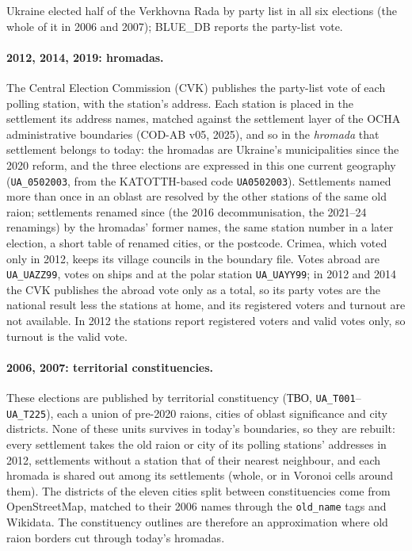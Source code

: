 Ukraine elected half of the Verkhovna Rada by party list in all six elections
(the whole of it in 2006 and 2007); BLUE\_DB reports the party-list vote.

\paragraph{2012, 2014, 2019: hromadas.}  The Central Election Commission (CVK)
publishes the party-list vote of each polling station, with the station's
address.  Each station is placed in the settlement its address names, matched
against the settlement layer of the OCHA administrative boundaries (COD-AB
v05, 2025), and so in the \textit{hromada} that settlement belongs to today:
the hromadas are Ukraine's municipalities since the 2020 reform, and the three
elections are expressed in this one current geography (\texttt{UA\_0502003},
from the KATOTTH-based code \texttt{UA0502003}).  Settlements named more than
once in an oblast are resolved by the other stations of the same old raion;
settlements renamed since (the 2016 decommunisation, the 2021--24 renamings)
by the hromadas' former names, the same station number in a later election, a
short table of renamed cities, or the postcode.  Crimea, which voted only in
2012, keeps its village councils in the boundary file.  Votes abroad are
\texttt{UA\_UAZZ99}, votes on ships and at the polar station \texttt{UA\_UAYY99};
in 2012 and 2014 the CVK publishes the abroad vote only as a total, so its
party votes are the national result less the stations at home, and its
registered voters and turnout are not available.  In 2012 the stations report
registered voters and valid votes only, so turnout is the valid vote.

\paragraph{2006, 2007: territorial constituencies.}  These elections are
published by territorial constituency (ТВО, \texttt{UA\_T001}--\texttt{UA\_T225}),
each a union of pre-2020 raions, cities of oblast significance and city
districts.  None of these units survives in today's boundaries, so they are
rebuilt: every settlement takes the old raion or city of its polling stations'
addresses in 2012, settlements without a station that of their nearest
neighbour, and each hromada is shared out among its settlements (whole, or in
Voronoi cells around them).  The districts of the eleven cities split between
constituencies come from OpenStreetMap, matched to their 2006 names through
the \texttt{old\_name} tags and Wikidata.  The constituency outlines are
therefore an approximation where old raion borders cut through today's
hromadas.


